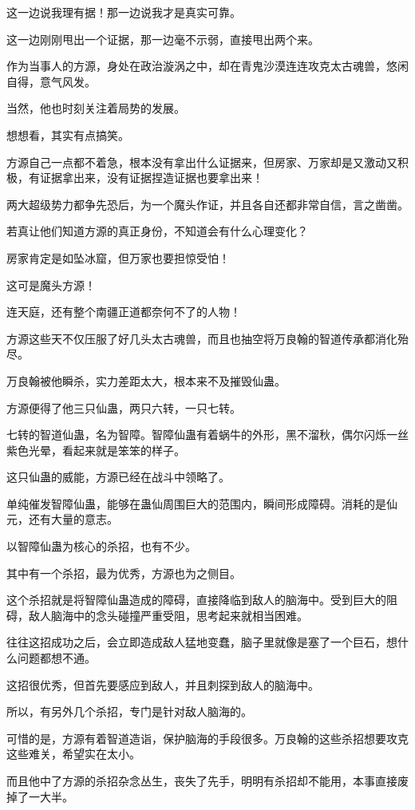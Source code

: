\begin{this_body}
这一边说我理有据！那一边说我才是真实可靠。

这一边刚刚甩出一个证据，那一边毫不示弱，直接甩出两个来。

作为当事人的方源，身处在政治漩涡之中，却在青鬼沙漠连连攻克太古魂兽，悠闲自得，意气风发。

当然，他也时刻关注着局势的发展。

想想看，其实有点搞笑。

方源自己一点都不着急，根本没有拿出什么证据来，但房家、万家却是又激动又积极，有证据拿出来，没有证据捏造证据也要拿出来！

两大超级势力都争先恐后，为一个魔头作证，并且各自还都非常自信，言之凿凿。

若真让他们知道方源的真正身份，不知道会有什么心理变化？

房家肯定是如坠冰窟，但万家也要担惊受怕！

这可是魔头方源！

连天庭，还有整个南疆正道都奈何不了的人物！

方源这些天不仅压服了好几头太古魂兽，而且也抽空将万良翰的智道传承都消化殆尽。

万良翰被他瞬杀，实力差距太大，根本来不及摧毁仙蛊。

方源便得了他三只仙蛊，两只六转，一只七转。

七转的智道仙蛊，名为智障。智障仙蛊有着蜗牛的外形，黑不溜秋，偶尔闪烁一丝紫色光晕，看起来就是笨笨的样子。

这只仙蛊的威能，方源已经在战斗中领略了。

单纯催发智障仙蛊，能够在蛊仙周围巨大的范围内，瞬间形成障碍。消耗的是仙元，还有大量的意志。

以智障仙蛊为核心的杀招，也有不少。

其中有一个杀招，最为优秀，方源也为之侧目。

这个杀招就是将智障仙蛊造成的障碍，直接降临到敌人的脑海中。受到巨大的阻碍，敌人脑海中的念头碰撞严重受阻，思考起来就相当困难。

往往这招成功之后，会立即造成敌人猛地变蠢，脑子里就像是塞了一个巨石，想什么问题都想不通。

这招很优秀，但首先要感应到敌人，并且刺探到敌人的脑海中。

所以，有另外几个杀招，专门是针对敌人脑海的。

可惜的是，方源有着智道造诣，保护脑海的手段很多。万良翰的这些杀招想要攻克这些难关，希望实在太小。

而且他中了方源的杀招杂念丛生，丧失了先手，明明有杀招却不能用，本事直接废掉了一大半。


\end{this_body}
